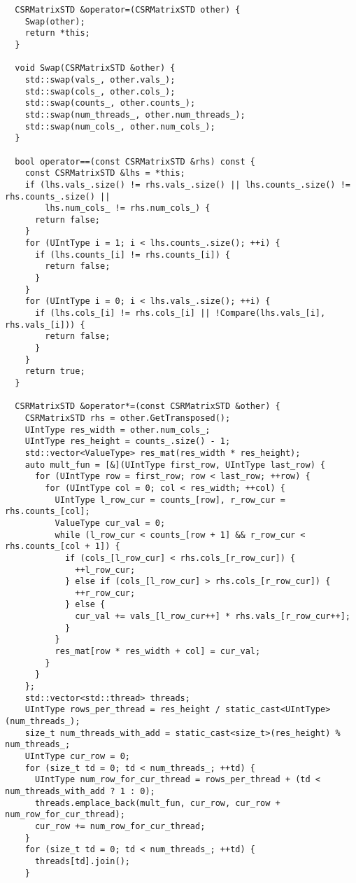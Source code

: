 \documentclass{report}
\begin{document}
\begin{lstlisting}
  CSRMatrixSTD &operator=(CSRMatrixSTD other) {
    Swap(other);
    return *this;
  }

  void Swap(CSRMatrixSTD &other) {
    std::swap(vals_, other.vals_);
    std::swap(cols_, other.cols_);
    std::swap(counts_, other.counts_);
    std::swap(num_threads_, other.num_threads_);
    std::swap(num_cols_, other.num_cols_);
  }

  bool operator==(const CSRMatrixSTD &rhs) const {
    const CSRMatrixSTD &lhs = *this;
    if (lhs.vals_.size() != rhs.vals_.size() || lhs.counts_.size() != rhs.counts_.size() ||
        lhs.num_cols_ != rhs.num_cols_) {
      return false;
    }
    for (UIntType i = 1; i < lhs.counts_.size(); ++i) {
      if (lhs.counts_[i] != rhs.counts_[i]) {
        return false;
      }
    }
    for (UIntType i = 0; i < lhs.vals_.size(); ++i) {
      if (lhs.cols_[i] != rhs.cols_[i] || !Compare(lhs.vals_[i], rhs.vals_[i])) {
        return false;
      }
    }
    return true;
  }

  CSRMatrixSTD &operator*=(const CSRMatrixSTD &other) {
    CSRMatrixSTD rhs = other.GetTransposed();
    UIntType res_width = other.num_cols_;
    UIntType res_height = counts_.size() - 1;
    std::vector<ValueType> res_mat(res_width * res_height);
    auto mult_fun = [&](UIntType first_row, UIntType last_row) {
      for (UIntType row = first_row; row < last_row; ++row) {
        for (UIntType col = 0; col < res_width; ++col) {
          UIntType l_row_cur = counts_[row], r_row_cur = rhs.counts_[col];
          ValueType cur_val = 0;
          while (l_row_cur < counts_[row + 1] && r_row_cur < rhs.counts_[col + 1]) {
            if (cols_[l_row_cur] < rhs.cols_[r_row_cur]) {
              ++l_row_cur;
            } else if (cols_[l_row_cur] > rhs.cols_[r_row_cur]) {
              ++r_row_cur;
            } else {
              cur_val += vals_[l_row_cur++] * rhs.vals_[r_row_cur++];
            }
          }
          res_mat[row * res_width + col] = cur_val;
        }
      }
    };
    std::vector<std::thread> threads;
    UIntType rows_per_thread = res_height / static_cast<UIntType>(num_threads_);
    size_t num_threads_with_add = static_cast<size_t>(res_height) % num_threads_;
    UIntType cur_row = 0;
    for (size_t td = 0; td < num_threads_; ++td) {
      UIntType num_row_for_cur_thread = rows_per_thread + (td < num_threads_with_add ? 1 : 0);
      threads.emplace_back(mult_fun, cur_row, cur_row + num_row_for_cur_thread);
      cur_row += num_row_for_cur_thread;
    }
    for (size_t td = 0; td < num_threads_; ++td) {
      threads[td].join();
    }


\end{lstlisting}
\end{document}
